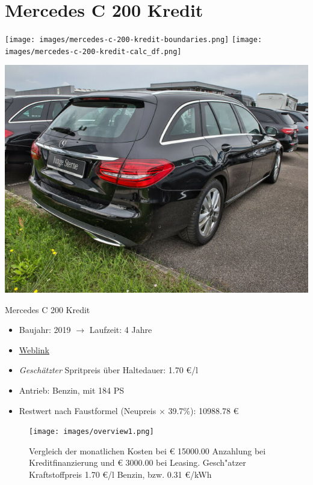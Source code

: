\documentclass[landscape, DIV=99, 14pt]{scrartcl}
\begin{document}
\section*{Mercedes C 200 Kredit}
\begin{center}
\texttt{[image: images/mercedes-c-200-kredit-boundaries.png]}
\null
\vspace{0.5cm}
\texttt{[image: images/mercedes-c-200-kredit-calc\_df.png]}
\end{center}

\pagebreak
\null
\vspace{2cm}
\begin{center}
\includegraphics[width=0.9\columnwidth]{cars/mercedes-c-200-t-leasing.png}

Mercedes C 200 Kredit
\end{center}

\begin{itemize}
    \item Baujahr: 2019 $\rightarrow$ Laufzeit: 4 Jahre
    \item \href{https://suchen.mobile.de/fahrzeuge/details.html?action=parkItem&id=327113608}{Weblink}
    \item \emph{Gesch\"atzter} Spritpreis \"uber Haltedauer: 1.70 \euro{}/l
    \item Antrieb: Benzin, mit 184 PS
    \item Restwert nach Faustformel (Neupreis $\times$ 39.7\%): 10988.78 \euro{}
\end{itemize}

\pagebreak



\pagebreak

\onecolumn
\begin{figure}
\centering
\caption{Vergleich der monatlichen Kosten bei \euro{} 15000.00 Anzahlung bei Kreditfinanzierung und \euro{} 3000.00 bei Leasing. Gesch"atzer Kraftstoffpreis 1.70 \euro{}/l Benzin, bzw. 0.31 \euro{}/kWh}
\texttt{[image: images/overview1.png]}
\end{figure}
\vfill 
\end{document}
